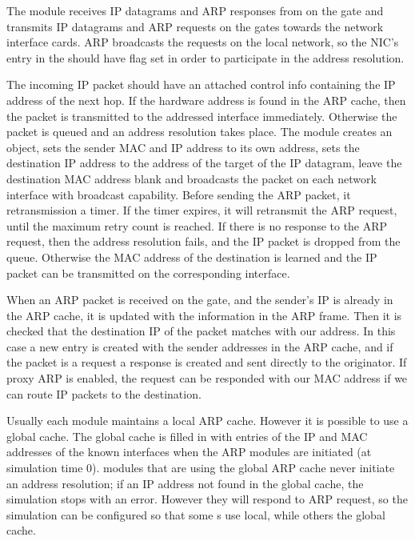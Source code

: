 The  module receives IP datagrams and ARP responses from 
on the  gate and transmits IP datagrams and ARP requests on the  gates
towards the network interface cards. ARP broadcasts the requests on the local network,
so the NIC's entry in the  should have  flag
set in order to participate in the address resolution.

The incoming IP packet should have an attached  control
info containing the IP address of the next hop. If the hardware address is found
in the ARP cache, then the packet is transmitted to the addressed interface immediately.
Otherwise the packet is queued and an address resolution takes place.
The  module creates an  object, sets the sender
MAC and IP address to its own address, sets the destination IP address
to the address of the target of the IP datagram, leave the destination MAC address
blank and broadcasts the packet on each network interface with broadcast capability.
Before sending the ARP packet, it retransmission a timer. If the timer expires,
it will retransmit the ARP request, until the maximum retry count is reached.
If there is no response to the ARP request, then the address resolution fails,
and the IP packet is dropped from the queue. Otherwise the MAC address of the
destination is learned and the IP packet can be transmitted on the corresponding
interface.

When an ARP packet is received on the  gate, and the sender's IP
is already in the ARP cache, it is updated with the information in the ARP frame.
Then it is checked that the destination IP of the packet matches with our
address. In this case a new entry is created with the sender addresses in the
ARP cache, and if the packet is a request a response is created and sent directly
to the originator. If proxy ARP is enabled, the request can be responded
with our MAC address if we can route IP packets to the destination.

Usually each  module maintains a local ARP cache.
However it is possible to use a global cache. The global cache is filled
in with entries of the IP and MAC addresses of the known interfaces
when the ARP modules are initiated (at simulation time 0).
 modules that are using the global ARP cache
never initiate an address resolution; if an IP address not
found in the global cache, the simulation stops with an error.
However they will respond to ARP request, so the simulation can
be configured so that some s use local, while others
the global cache.

